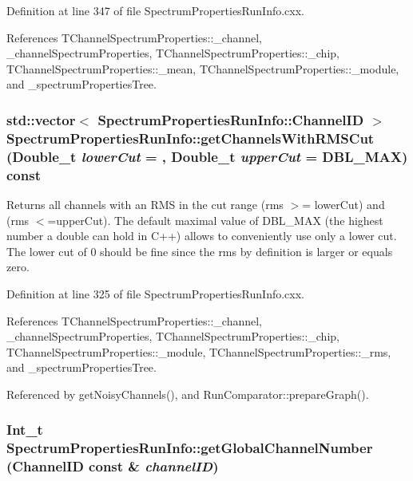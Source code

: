 Definition at line 347 of file SpectrumPropertiesRunInfo.cxx.

References TChannelSpectrumProperties::\_\-channel, \_\-channelSpectrumProperties, TChannelSpectrumProperties::\_\-chip, TChannelSpectrumProperties::\_\-mean, TChannelSpectrumProperties::\_\-module, and \_\-spectrumPropertiesTree.\hypertarget{class_spectrum_properties_run_info_aa2d88f63b3ea5d414bbe98708689a706}{
\subsubsection[{getChannelsWithRMSCut}]{\setlength{\rightskip}{0pt plus 5cm}std::vector$<$ {\bf SpectrumPropertiesRunInfo::ChannelID} $>$ SpectrumPropertiesRunInfo::getChannelsWithRMSCut (Double\_\-t {\em lowerCut} = {}, \/  Double\_\-t {\em upperCut} = {\ttfamily DBL\_\-MAX}) const}}
\label{class_spectrum_properties_run_info_aa2d88f63b3ea5d414bbe98708689a706}


Returns all channels with an RMS in the cut range (rms $>$= lowerCut) and (rms $<$=upperCut). The default maximal value of DBL\_\-MAX (the highest number a double can hold in C++) allows to conveniently use only a lower cut. The lower cut of 0 should be fine since the rms by definition is larger or equals zero. 

Definition at line 325 of file SpectrumPropertiesRunInfo.cxx.

References TChannelSpectrumProperties::\_\-channel, \_\-channelSpectrumProperties, TChannelSpectrumProperties::\_\-chip, TChannelSpectrumProperties::\_\-module, TChannelSpectrumProperties::\_\-rms, and \_\-spectrumPropertiesTree.

Referenced by getNoisyChannels(), and RunComparator::prepareGraph().\hypertarget{class_spectrum_properties_run_info_a37a1ce79abc052318a89ada72699058c}{
\subsubsection[{getGlobalChannelNumber}]{\setlength{\rightskip}{0pt plus 5cm}Int\_\-t SpectrumPropertiesRunInfo::getGlobalChannelNumber ({\bf ChannelID} const \& {\em channelID})}}
\label{class_spectrum_properties_run_info_a37a1ce79abc052318a89ada72699058c}


